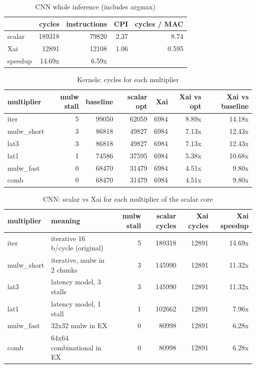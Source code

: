 \begin{table}[t]
\centering
\caption{CNN whole inference (includes argmax)}
\label{tab:cnn_total}
\begin{tabular}{lrrrr}
\toprule
 & cycles & instructions & CPI & cycles / MAC \\
\midrule
scalar & 189318 & 79820 & 2.37 & 8.74 \\
Xai & 12891 & 12108 & 1.06 & 0.595 \\
speedup & 14.69x & 6.59x &  &  \\
\bottomrule
\end{tabular}
\end{table}

\begin{table}[t]
\centering
\caption{Kernels: cycles for each multiplier}
\label{tab:kernel_mulsweep}
\begin{tabular}{lrrrrrr}
\toprule
multiplier & mulw stall & baseline & scalar opt & Xai & Xai vs opt & Xai vs baseline \\
\midrule
iter & 5 & 99050 & 62059 & 6984 & 8.89x & 14.18x \\
mulw\_short & 3 & 86818 & 49827 & 6984 & 7.13x & 12.43x \\
lat3 & 3 & 86818 & 49827 & 6984 & 7.13x & 12.43x \\
lat1 & 1 & 74586 & 37595 & 6984 & 5.38x & 10.68x \\
mulw\_fast & 0 & 68470 & 31479 & 6984 & 4.51x & 9.80x \\
comb & 0 & 68470 & 31479 & 6984 & 4.51x & 9.80x \\
\bottomrule
\end{tabular}
\end{table}

\begin{table}[t]
\centering
\caption{CNN: scalar vs Xai for each multiplier of the scalar core}
\label{tab:cnn_mulsweep}
\begin{tabular}{llrrrr}
\toprule
multiplier & meaning & mulw stall & scalar cycles & Xai cycles & Xai speedup \\
\midrule
iter & iterative 16 b/cycle (original) & 5 & 189318 & 12891 & 14.69x \\
mulw\_short & iterative, mulw in 2 chunks & 3 & 145990 & 12891 & 11.32x \\
lat3 & latency model, 3 stalls & 3 & 145990 & 12891 & 11.32x \\
lat1 & latency model, 1 stall & 1 & 102662 & 12891 & 7.96x \\
mulw\_fast & 32x32 mulw in EX & 0 & 80998 & 12891 & 6.28x \\
comb & 64x64 combinational in EX & 0 & 80998 & 12891 & 6.28x \\
\bottomrule
\end{tabular}
\end{table}

